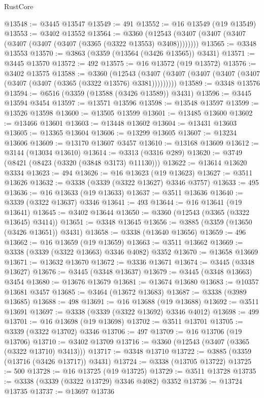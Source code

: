 \begin{lexlean}{RustCore}
\begin{coremodule}
@13548 := @3445 @13547
@13549 := 491
@13552 := @16 @13549 (@19 @13549)
@13553 := @3402 @13552
@13564 := @3360
    (@12543 (@3407 (@3407 (@3407 (@3407 (@3407 (@3407 (@3365 (@3322 @13553) @3408))))))))
@13565 := @3348 @13553
@13570 := @3863 (@3359 (@13564 (@3426 @13565)) @3431)
@13571 := @3445 @13570
@13572 := 492
@13575 := @16 @13572 (@19 @13572)
@13576 := @3402 @13575
@13588 := @3360
    (@12543 (@3407 (@3407 (@3407 (@3407 (@3407 (@3407 (@3407 (@3365 (@3322 @13576) @3381)))))))))
@13589 := @3348 @13576
@13594 := @6516 (@3359 (@13588 (@3426 @13589)) @3431)
@13596 := @3445 @13594 @3454
@13597 := @13571 @13596
@13598 := @13548 @13597
@13599 := @13526 @13598
@13600 := @13505 @13599
@13601 := @13485 @13600
@13602 := @13466 @13601
@13603 := @13448 @13602
@13604 := @13431 @13603
@13605 := @13365 @13604
@13606 := @13299 @13605
@13607 := @13234 @13606
@13609 := @13170 @13607 @3457
@13610 := @13168 @13609
@13612 := @3144 (@13034 @13610)
@13614 := @3313 (@3316 @289)
@13620 := @3749 (@8421 (@8423 (@3320 (@3848 @3173) @11130)))
@13622 := @13614 @13620 @3334
@13623 := 494
@13626 := @16 @13623 (@19 @13623)
@13627 := @3511 @13626
@13632 := @3338 (@3339 (@3322 @13627) @3346 @3757)
@13633 := 495
@13636 := @16 @13633 (@19 @13633)
@13637 := @3511 @13636
@13640 := @3339 (@3322 @13637) @3346
@13641 := 493
@13644 := @16 @13641 (@19 @13641)
@13645 := @3402 @13644
@13650 := @3360 (@12543 (@3365 (@3322 @13645) @3414))
@13651 := @3348 @13645
@13656 := @3885 (@3359 (@13650 (@3426 @13651)) @3431)
@13658 := @3338 (@13640 @13656)
@13659 := 496
@13662 := @16 @13659 (@19 @13659)
@13663 := @3511 @13662
@13669 := @3338 (@3339 (@3322 @13663) @3346 @4082) @3352
@13670 := @13658 @13669
@13671 := @13632 @13670
@13672 := @3336 @13671
@13674 := @3445 (@3348 @13627)
@13676 := @3445 (@3348 @13637)
@13679 := @3445 (@3348 @13663) @3454
@13680 := @13676 @13679
@13681 := @13674 @13680
@13683 := @10357 @13681 @3457
@13685 := @3464 (@13672 @13683)
@13687 := @3338 (@3989 @13685)
@13688 := 498
@13691 := @16 @13688 (@19 @13688)
@13692 := @3511 @13691
@13697 := @3338 (@3339 (@3322 @13692) @3346 @4012)
@13698 := 499
@13701 := @16 @13698 (@19 @13698)
@13702 := @3511 @13701
@13705 := @3339 (@3322 @13702) @3346
@13706 := 497
@13709 := @16 @13706 (@19 @13706)
@13710 := @3402 @13709
@13716 := @3360 (@12543 (@3407 (@3365 (@3322 @13710) @3413)))
@13717 := @3348 @13710
@13722 := @3885 (@3359 (@13716 (@3426 @13717)) @3431)
@13724 := @3338 (@13705 @13722)
@13725 := 500
@13728 := @16 @13725 (@19 @13725)
@13729 := @3511 @13728
@13735 := @3338 (@3339 (@3322 @13729) @3346 @4082) @3352
@13736 := @13724 @13735
@13737 := @13697 @13736

\end{coremodule}
\end{lexlean}
